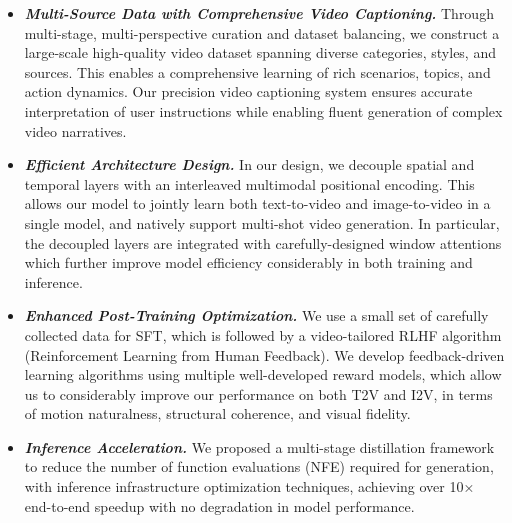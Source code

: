 \begin{itemize}[leftmargin=*]

 \item \textbf{\textit{Multi-Source Data with Comprehensive Video Captioning.}} Through multi-stage, multi-perspective curation and dataset balancing, we construct a large-scale high-quality video dataset spanning diverse categories, styles, and sources. This enables a comprehensive learning of rich scenarios, topics, and action dynamics. Our precision video captioning system ensures accurate interpretation of user instructions while enabling fluent generation of complex video narratives.

 \item \textbf{\textit{Efficient Architecture Design.}}  
 In our design, we decouple spatial and temporal layers with an interleaved multimodal positional encoding. This allows our model to jointly learn both text-to-video and image-to-video in a single model, and natively support multi-shot video generation. In particular, the decoupled layers are integrated with carefully-designed window attentions which further improve model efficiency considerably in both training and inference.
 
 

 \item \textbf{\textit{Enhanced Post-Training Optimization.}}  We use a small set of carefully collected data for SFT, which is followed by a video-tailored RLHF algorithm (Reinforcement Learning from Human Feedback). We develop feedback-driven learning algorithms using multiple well-developed reward models, which allow us to considerably improve our performance on both T2V and I2V, in terms of motion naturalness, structural coherence, and visual fidelity.
 
 


 \item \textbf{\textit{Inference Acceleration.}} We proposed a multi-stage distillation framework to reduce the number of function evaluations (NFE) required for generation, with inference infrastructure optimization techniques, achieving over 10× end-to-end speedup with no degradation in model performance. 

\end{itemize} 

